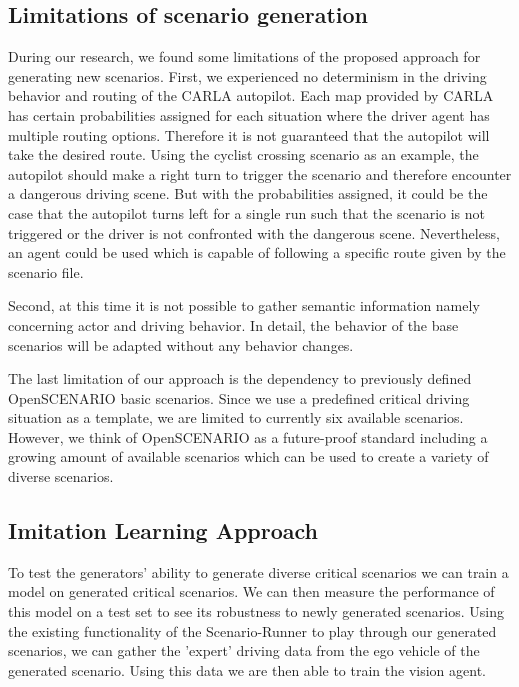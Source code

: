\documentclass[conference, a4paper, 11pt]{IEEEtran}
\begin{document}
\subsection{Limitations of scenario generation}
During our research, we found some limitations of the proposed approach for generating new scenarios. First, we experienced no determinism in the driving behavior and routing of the CARLA autopilot. Each map provided by CARLA has certain probabilities assigned for each situation where the driver agent has multiple routing options. Therefore it is not guaranteed that the autopilot will take the desired route. Using the cyclist crossing scenario as an example, the autopilot should make a right turn to trigger the scenario and therefore encounter a dangerous driving scene. But with the probabilities assigned, it could be the case that the autopilot turns left for a single run such that the scenario is not triggered or the driver is not confronted with the dangerous scene. Nevertheless, an agent could be used which is capable of following a specific route given by the scenario file.

Second, at this time it is not possible to gather semantic information namely concerning actor and driving behavior. In detail, the behavior of the base scenarios will be adapted without any behavior changes.  

The last limitation of our approach is the dependency to previously defined OpenSCENARIO basic scenarios. Since we use a predefined critical driving situation as a template, we are limited to currently six available scenarios. However, we think of OpenSCENARIO as a future-proof standard including a growing amount of available scenarios which can be used to create a variety of diverse scenarios.

\subsection{Imitation Learning Approach}
To test the generators' ability to generate diverse critical scenarios we can train a model on generated critical scenarios. We can then measure the performance of this model on a test set to see its robustness to newly generated scenarios. Using the existing functionality of the Scenario-Runner to play through our generated scenarios, we can gather the 'expert' driving data from the ego vehicle of the generated scenario. Using this data we are then able to train the vision agent.
\end{document}
